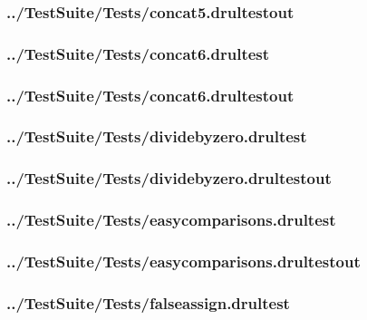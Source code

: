 \begin{changemargin}{-1in}{-1in}
\subsubsection{../TestSuite/Tests/concat5.drultestout}


\subsubsection{../TestSuite/Tests/concat6.drultest}


\subsubsection{../TestSuite/Tests/concat6.drultestout}


\subsubsection{../TestSuite/Tests/dividebyzero.drultest}


\subsubsection{../TestSuite/Tests/dividebyzero.drultestout}


\subsubsection{../TestSuite/Tests/easycomparisons.drultest}


\subsubsection{../TestSuite/Tests/easycomparisons.drultestout}


\subsubsection{../TestSuite/Tests/falseassign.drultest}



\end{changemargin}

